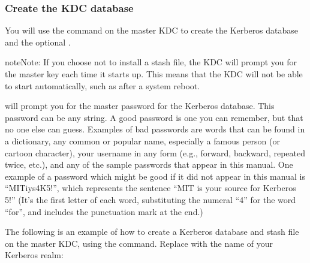 \documentclass[letterpaper,10pt,english]{sphinxmanual}
\begin{document}
\subsubsection{Create the KDC database}
\label{\detokenize{admin/install_kdc:create-the-kdc-database}}\label{\detokenize{admin/install_kdc:create-db}}
You will use the {\hyperref[\detokenize{admin/admin_commands/kdb5_util:kdb5-util-8}]{}} command on the master KDC to
create the Kerberos database and the optional .

\begin{sphinxadmonition}{note}{Note:}
If you choose not to install a stash file, the KDC will
prompt you for the master key each time it starts up.  This
means that the KDC will not be able to start automatically,
such as after a system reboot.
\end{sphinxadmonition}

{\hyperref[\detokenize{admin/admin_commands/kdb5_util:kdb5-util-8}]{}} will prompt you for the master password for the
Kerberos database.  This password can be any string.  A good password
is one you can remember, but that no one else can guess.  Examples of
bad passwords are words that can be found in a dictionary, any common
or popular name, especially a famous person (or cartoon character),
your username in any form (e.g., forward, backward, repeated twice,
etc.), and any of the sample passwords that appear in this manual.
One example of a password which might be good if it did not appear in
this manual is “MITiys4K5!”, which represents the sentence “MIT is
your source for Kerberos 5!”  (It’s the first letter of each word,
substituting the numeral “4” for the word “for”, and includes the
punctuation mark at the end.)

The following is an example of how to create a Kerberos database and
stash file on the master KDC, using the {\hyperref[\detokenize{admin/admin_commands/kdb5_util:kdb5-util-8}]{}} command.
Replace  with the name of your Kerberos realm:
\end{document}
